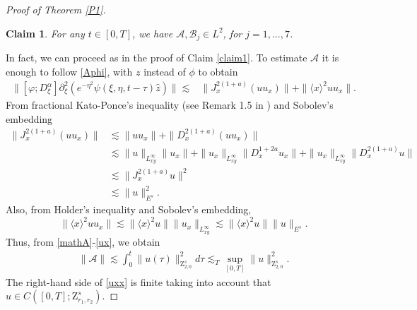 \documentclass[reqno]{amsart}
\newcommand{\va}{\varphi}
\newcommand{\les}{\lesssim}
\newcommand{\lanx}{\langle x \rangle}
\newcommand{\p}{\partial}
\numberwithin{equation}{section}
\newtheorem{claim}[theorem]{Claim}
\begin{document}
\begin{proof}[Proof of Theorem \ref{P1}]
\begin{claim}\label{claim2}
For any $t\in [0,T]$, we have $\mathcal A, \mathcal B_j \in L^2$, for $j=1,...,7$.
\end{claim}
In fact, we can proceed as in the proof of Claim \ref{claim1}. To estimate $\mathcal A$ it is enough to follow  \eqref{Aphi}, with $z$ instead of $\phi$ to obtain
\begin{equation}
\begin{split}\label{mathA}
\|[\va;D_{\xi}^{\alpha}]\p_\xi^2(e^{-\eta^2}\psi(\xi,\eta,t-\tau)\hat{z})\| \les & \|J_x^{2(1+a)}(uu_x)\|+\|\lanx^2 uu_x\|.
\end{split}
\end{equation} 
From fractional Kato-Ponce's inequality (see Remark 1.5 in \cite{dong}) and Sobolev's embedding
\begin{equation}
\begin{split}\label{1.5}
\|J_x^{2(1+a)}(uu_x)\|&\les \|uu_x\|+\|D_x^{2(1+a)}(uu_x)\|\\
&\les \|u\|_{L^\infty_{xy}}\|u_x\|+\|u_x\|_{L^\infty_{xy}}\|D_x^{1+2a}u_x\|+\|u_x\|_{L^\infty_{xy}}\|D_x^{2(1+a)}u\|\\
&\lesssim \|J_x^{2(1+a)} u\|^2\\
&\les  \|u\|_{E^s}^2.
\end{split}
\end{equation}
Also, from Holder's inequality and Sobolev's embedding,
\begin{equation}\label{ux}
\|\lanx^2 uu_x\|\les \|\lanx^2 u\|\|u_x\|_{L^\infty_{xy}}\les \|\lanx^2 u\|\|u\|_{E^s}.
\end{equation}
Thus, from \eqref{mathA}-\eqref{ux}, we obtain
\begin{equation}\label{uxx}
\begin{split}
\|\mathcal A\|\les \int_0^t \|u(\tau)\|_{\mathrm{Z}_{2,0}^s }^2 d\tau
\les_{T} \sup_{[0,T]}\|u\|_{\mathrm{Z}_{2,0}^s }^2.
\end{split}
\end{equation}
The right-hand side of \eqref{uxx} is finite taking into account that $u\in C([0,T]; \mathrm{Z}^s_{r_1,r_2})$.



\end{proof}
\end{document}
